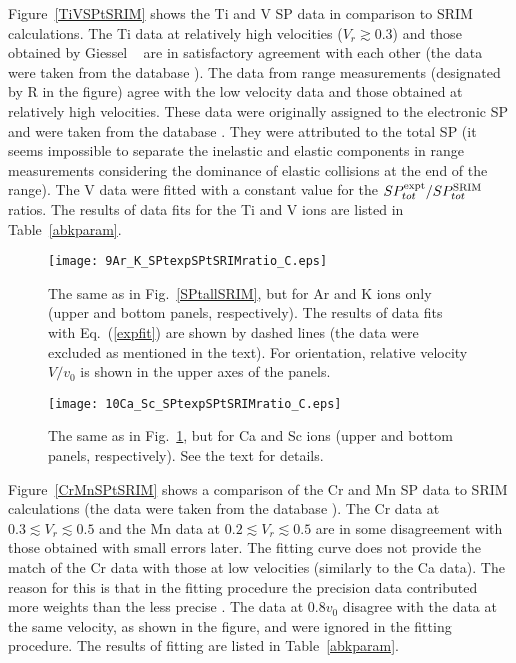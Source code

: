\documentclass[aps,pra,twocolumn,amsmath,amssymb,floatfix]{revtex4-2}
\begin{document}
Figure~\ref{TiVSPtSRIM} shows the Ti and V SP data in comparison to SRIM calculations. The Ti data at relatively high velocities ($V_{r} \gtrsim 0.3$) \cite{Pape78,AnthLanf82,Abdess92,Sharma99,ShyKum96,Harikumar96} and those obtained by Giessel \ea\ \cite{IAEASP} are in satisfactory agreement with each other (the data \cite{AnthLanf82} were taken from the database \cite{IAEASP}).  The data from range measurements \cite{ShuKal91} (designated by R in the figure) agree with the low velocity data \cite{Hvelp68} and those obtained at relatively high velocities. These data were originally assigned to the electronic SP \cite{ShuKal91} and were taken from the database \cite{IAEASP}. They were attributed to the total SP (it seems impossible to separate the inelastic and elastic components in range measurements considering the dominance of elastic collisions at the end of the range).  The V data \cite{Sharma99} were fitted with a constant value for the $SP_{tot}^{\rm expt}/SP_{tot}^{\rm SRIM}$ ratios. The results of data fits for the Ti and V ions are listed in Table~\ref{abkparam}.

\begin{figure}[!h]   %
\begin{center}
\texttt{[image: 9Ar\_K\_SPtexpSPtSRIMratio\_C.eps]}
\caption{\label{ArKSPtSRIM}The same as in Fig.~\ref{SPtallSRIM}, but for Ar and K ions only (upper and bottom panels, respectively). The results of data fits with Eq.~(\ref{expfit}) are shown by dashed lines (the data \cite{Lennard86,Pape78} were excluded as mentioned in the text). For orientation, relative velocity $V/v_{0}$ is shown in the upper axes of the panels.}
\end{center}
\end{figure}

\begin{figure}[!h]   %
\begin{center}
\texttt{[image: 10Ca\_Sc\_SPtexpSPtSRIMratio\_C.eps]}
\caption{\label{CaScSPtSRIM} The same as in Fig.~\ref{ArKSPtSRIM}, but for Ca and Sc ions (upper and bottom panels, respectively). See the text for details.}
\end{center}
\end{figure}

Figure~\ref{CrMnSPtSRIM}  shows a comparison of the Cr and Mn SP data \cite{Zhang2002,Hvelp68,Lennard86,ShyKum96,Sharma99} to SRIM calculations  (the data \cite{Zhang2002} were taken from the database \cite{IAEASP}). The Cr data at $0.3 \lesssim V_{r} \lesssim 0.5$ \cite{ShyKum96} and the Mn data at $0.2 \lesssim V_{r} \lesssim 0.5$ \cite{Sharma99} are in some disagreement with those obtained with small errors \cite{Zhang2002} later. The fitting curve does not provide the match of the Cr data \cite{Zhang2002} with those at low velocities \cite{Hvelp68} (similarly to the Ca data). The reason for this is that in the fitting procedure the precision data \cite{Zhang2002} contributed more weights than the less precise \cite{Hvelp68,ShyKum96,Sharma99}. The data at $0.8v_{0}$ \cite{Lennard86} disagree with the data \cite{Hvelp68} at the same velocity, as shown in the figure, and were ignored in the fitting procedure. The results of fitting are listed in Table~\ref{abkparam}.
\end{document}
